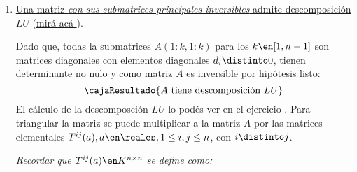 \begin{enumerate}[label=\alph*)]
  \item \ul{Una matriz \textit{con sus submatrices principales inversibles} admite descomposición $LU$} (\hyperlink{teoria:3-lu}{mirá acá \click}).

        Dado que, todas la submatrices $A(1:k, 1:k)$ para los $k \en [1, n-1]$ son matrices diagonales con elementos diagonales $d_i \distinto 0$,
        tienen determinante no nulo y como matriz $A$ es inversible por hipótesis listo:
        $$
          \cajaResultado{
            A \text{ tiene descomposición } LU
          }
        $$
        El cálculo de la descomposción $LU$ lo podés ver en el ejercicio .
        Para triangular la matriz se puede multiplicar a la matriz $A$ por las matrices elementales
        $T^{ij}(a), a \en \reales, 1\leq i, j \leq n$, con $i \distinto j$.

        \textit{Recordar que $T^{ij}(a) \en K^{n \times n}$ se define como:}


\end{enumerate}
